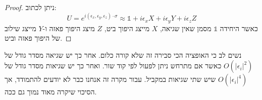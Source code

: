 \documentclass{tstextbook}
\begin{document}
\begin{proof}
ניתן לכתוב:
$$U=e^{i(\epsilon_{x},\epsilon_{y},\epsilon_{z})\cdot\sigma}\approx\mathbb{1}+i\epsilon_{x}X+i\epsilon_{y}Y+i\epsilon_{z}Z$$
כאשר היחידה \(\mathbb{1}\) מסמן שאין שגיאה, \(X\) מייצג היפוך ביט, \(Z\) מיצג היפוך פאזה ו-\(Y\) מייצג שילוב של היפוך פאזה וביט.

\end{proof}
\begin{remark}
נשים לב כי האופציה הכי סבירה זה שלא קורה כלום. אחר כך יש שגיאה מסדר גודל של \(O\left( |\epsilon_{i}|^{2}  \right)\) כאשר אם מתרחש ניתן לפעול לפי קוד שור. ואחר כך יש שגיאות מסדר גודל של \(O\left( |\epsilon_{i}|^{4} \right)\) שיש שתי שגיאות במקביל. עבור מקרה זה אנחנו כבר לא יודעים להתמודד, אך הסיכוי שיקרה מאוד נמוך גם ככה.

\end{remark}
\end{document}
